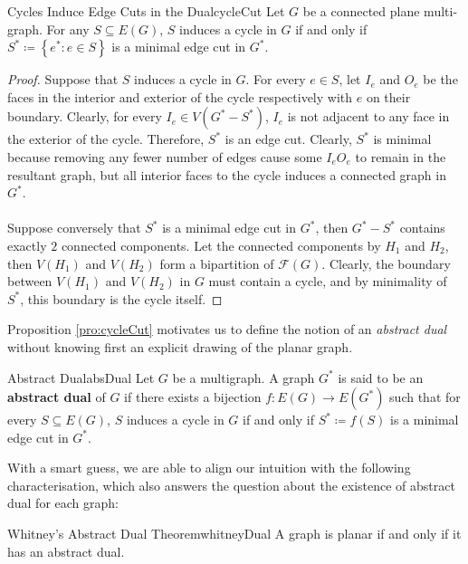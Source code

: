\documentclass[math, code]{amznotes}
\theoremstyle{remark}
\begin{document}
\begin{probox}{Cycles Induce Edge Cuts in the Dual}{cycleCut}
    Let $G$ be a connected plane multi-graph. For any $S \subseteq E(G)$, $S$ induces a cycle in $G$ if and only if $S^* \coloneqq \left\{e^* \colon e \in S\right\}$ is a minimal edge cut in $G^*$.
    \tcblower
    \begin{proof}
        Suppose that $S$ induces a cycle in $G$. For every $e \in S$, let $I_e$ and $O_e$ be the faces in the interior and exterior of the cycle respectively with $e$ on their boundary. Clearly, for every $I_e \in V(G^* - S^*)$, $I_e$ is not adjacent to any face in the exterior of the cycle. Therefore, $S^*$ is an edge cut. Clearly, $S^*$ is minimal because removing any fewer number of edges cause some $I_eO_e$ to remain in the resultant graph, but all interior faces to the cycle induces a connected graph in $G^*$.
        \\\\
        Suppose conversely that $S^*$ is a minimal edge cut in $G^*$, then $G^* - S^*$ contains exactly $2$ connected components. Let the connected components by $H_1$ and $H_2$, then $V(H_1)$ and $V(H_2)$ form a bipartition of $\mathcal{F}(G)$. Clearly, the boundary between $V(H_1)$ and $V(H_2)$ in $G$ must contain a cycle, and by minimality of $S^*$, this boundary is the cycle itself. 
    \end{proof}
\end{probox}
Proposition \ref{pro:cycleCut} motivates us to define the notion of an \textit{abstract dual} without knowing first an explicit drawing of the planar graph.
\begin{dfnbox}{Abstract Dual}{absDual}
    Let $G$ be a multigraph. A graph $G^*$ is said to be an {\color{red} \textbf{abstract dual}} of $G$ if there exists a bijection $f \colon E(G) \to E(G^*)$ such that for every $S \subseteq E(G)$, $S$ induces a cycle in $G$ if and only if $S^* \coloneqq f(S)$ is a minimal edge cut in $G^*$.
\end{dfnbox}
With a smart guess, we are able to align our intuition with the following characterisation, which also answers the question about the existence of abstract dual for each graph:
\begin{thmbox}{Whitney's Abstract Dual Theorem}{whitneyDual}
    A graph is planar if and only if it has an abstract dual.
\end{thmbox}
\end{document}
